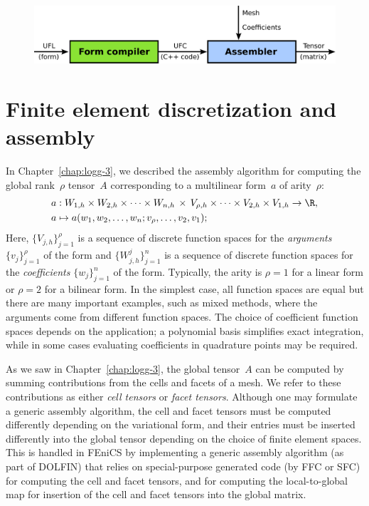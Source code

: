 \begin{figure}
\bwfig
          {\includegraphics[width=\fullfig]{chapters/alnes-2/pdf/ufc_flowdiagram.pdf}}
\end{figure}

\section{Finite element discretization and assembly}
\label{sec:alnes-2fem}

In Chapter~\ref{chap:logg-3}, we described the assembly algorithm for
computing the global rank~$\rho$ tensor~$A$ corresponding to a
multilinear form~$a$ of arity~$\rho$:
\begin{equation} \label{eq:varform}
  \begin{split}
    a &: W_{1,h} \times W_{2,h} \times \cdots \times W_{n,h} \, \times \,
    V_{\rho,h} \times \cdots \times V_{2,h} \times V_{1,h} \rightarrow \R, \\
    a &\mapsto a(w_1, w_2, \ldots, w_n; v_{\rho}, \ldots, v_2, v_1);
  \end{split}
\end{equation}
Here, $\{V_{j,h}\}_{j=1}^{\rho}$ is a sequence of discrete function
spaces for the \emph{arguments} $\{v_j\}_{j=1}^{\rho}$ of the form and
$\{W_{j,h}^j\}_{j=1}^n$ is a sequence of discrete function spaces for
the \emph{coefficients} $\{w_j\}_{j=1}^n$ of the form. Typically, the
arity is $\rho=1$ for a linear form or $\rho=2$ for a bilinear
form. In the simplest case, all function spaces are equal but there
are many important examples, such as mixed methods, where the
arguments come from different function spaces. The choice of
coefficient function spaces depends on the application; a polynomial
basis simplifies exact integration, while in some cases evaluating
coefficients in quadrature points may be required.

As we saw in Chapter~\ref{chap:logg-3}, the global tensor~$A$ can be
computed by summing contributions from the cells and facets of a
mesh. We refer to these contributions as either \emph{cell tensors} or
\emph{facet tensors}. Although one may formulate a generic assembly
algorithm, the cell and facet tensors must be computed differently
depending on the variational form, and their entries must be inserted
differently into the global tensor depending on the choice of finite
element spaces. This is handled in FEniCS by implementing a generic
assembly algorithm (as part of DOLFIN) that relies on special-purpose
generated code (by FFC or SFC) for computing the cell and facet
tensors, and for computing the local-to-global map for insertion of
the cell and facet tensors into the global matrix.

